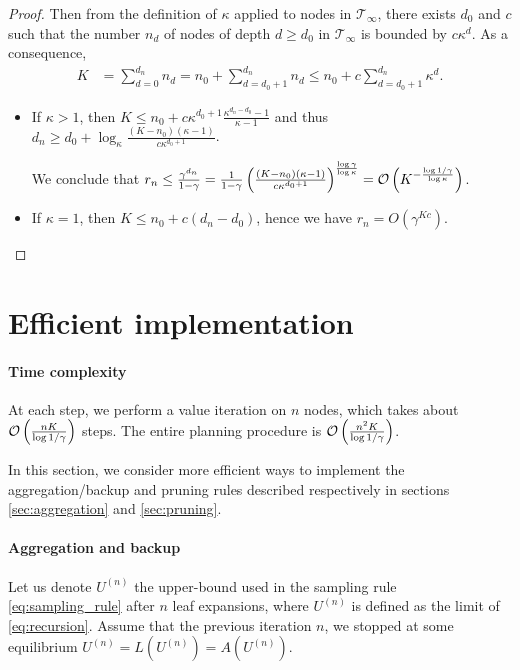 \documentclass{article}
\begin{document}
\begin{proof}
	Then from the definition of $\kappa$ applied to nodes in $\mathcal{T}_\infty$, there exists $d_0$ and $c$ such that the number $n_d$ of nodes of depth $d \geq d_0$ in $\mathcal{T}_\infty$ is bounded by $c\kappa^d$. As a consequence, 
	\begin{eqnarray*}
		K &= \sum_{d=0}^{d_n} n_d = n_0 + \sum_{d=d_0+1}^{d_n} n_d \leq n_0 + c\sum_{d={d_0+1}}^{d_n} \kappa^d.
	\end{eqnarray*}
	
	\begin{itemize}
		\item If $\kappa > 1$, then $K \leq n_0 + c\kappa^{d_0+1}\frac{\kappa^{d_n-d_0}-1}{\kappa-1}$ and thus $d_n \geq d_0 + \log_\kappa \frac{(K-n_0)(\kappa - 1)}{c\kappa^{d_0+1}}$.
		
		We conclude that $r_n \leq \frac{\gamma^{d_n}}{1-\gamma} = \frac{1}{1-\gamma} \left( \frac{(K-n_0)(\kappa - 1)}{c\kappa^{d_0+1}} \right)^\frac{\log \gamma}{\log \kappa} = \mathcal{O}\left(K^{-\frac{\log 1/\gamma}{\log \kappa}}\right)$.
		
		\item If $\kappa = 1$, then $K \leq n_0 + c(d_n-d_0)$, hence we have $r_n = O\left(\gamma^{Kc}\right)$.
	\end{itemize}
\end{proof}

\section{Efficient implementation}

\paragraph{Time complexity}
 At each step, we perform a value iteration on $n$ nodes, which takes about $\mathcal{O}\left(\frac{n K}{\log 1/\gamma}\right)$ steps. The entire planning procedure is $\mathcal{O}\left(\frac{n^2 K}{\log 1/\gamma}\right)$.

In this section, we consider more efficient ways to implement the aggregation/backup and pruning rules described respectively in sections \ref{sec:aggregation} and \ref{sec:pruning}.

\paragraph{Aggregation and backup}
Let us denote $U^{(n)}$ the upper-bound used in the sampling rule \eqref{eq:sampling_rule} after $n$ leaf expansions, where $U^{(n)}$ is defined as the limit of \eqref{eq:recursion}. Assume that the previous iteration $n$, we stopped at some equilibrium $U^{(n)} = L(U^{(n)}) = A(U^{(n)})$.
\end{document}
